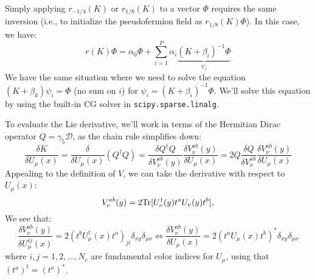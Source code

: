 Simply applying $r_{-1/4}(K)$ or $r_{1/8}(K)$ to a vector $\Phi$ requires the same inversion (i.e., to initialize the pseudofermion field as $r_{1/8}(K) \Phi$). In this case, we have:
\begin{equation}
	r(K) \Phi = \alpha_0 \Phi + \sum_{i =1}^P \alpha_i \underbrace{ \left( K + \beta_i \right)^{-1} \Phi }_{\psi_i}
\end{equation}
We have the same situation where we need to solve the equation $(K + \beta_k) \psi_i = \Phi$ (no sum on $i$) for $\psi_i = (K + \beta_i)^{-1}\Phi$. We'll solve this equation by using the built-in CG solver in \lstinline{scipy.sparse.linalg}. 

To evaluate the Lie derivative, we'll work in terms of the Hermitian Dirac operator $Q = \gamma_5 \mathcal D$, as the chain rule simplifies down:
\begin{equation}
	\frac{\delta K}{\delta U_\mu(x)} = \frac{\delta}{\delta U_\mu(x)} (Q^\dagger Q) = \frac{\delta Q^\dagger Q}{\delta V_\nu^{ab}(y)} \frac{\delta V_\nu^{ab}(y)}{\delta U_\mu(x)} = 2 Q \frac{\delta Q}{\delta V_\nu^{ab}} \frac{\delta V_\nu^{ab}(y)}{\delta U_\mu(x)}
\end{equation}
Appealing to the definition of $V$, we can take the derivative with respect to $U_\mu(x)$:
\begin{equation}
	V_\nu^{ab}(y) = 2\mathrm{Tr}[ U_\nu^\dagger(y) t^a U_\nu(y) t^b],
\end{equation}
We see that:
\begin{equation}
	\frac{\delta V_\nu^{ab}(y)}{\delta U_\mu^{ij}(x)} = 2 \left( t^b U_\mu^\dagger(x) t^a \right)_{ji} \delta_{xy} \delta_{\mu\nu} \iff \frac{\delta V_\nu^{ab}(y)}{\delta U_\mu(x)} = 2 \left(t^a U_\mu(x) t^b \right)^* \delta_{xy} \delta_{\mu\nu}
\end{equation}
where $i, j = 1, 2, ..., N_c$ are fundamental color indices for $U_\mu$, using that $(t^a)^t = (t^a)^*$. 

